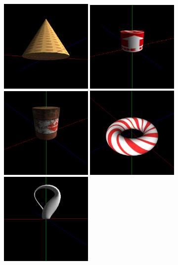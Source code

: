 \documentclass[12pt, a4paper]{article}
\begin{document}
\begin{figure}[H]
    \centering
    \includegraphics[width=0.4\textwidth]{res/phase4/results/Cone.png}
    \includegraphics[width=0.4\textwidth]{res/phase4/results/CylinderSingleTexture.png}
    \includegraphics[width=0.4\textwidth]{res/phase4/results/CylinderMultiTexture.png}
    \includegraphics[width=0.4\textwidth]{res/phase4/results/Torus.png}
    \includegraphics[width=0.4\textwidth]{res/phase4/results/KleinBottle.png}

\end{figure}
\end{document}
